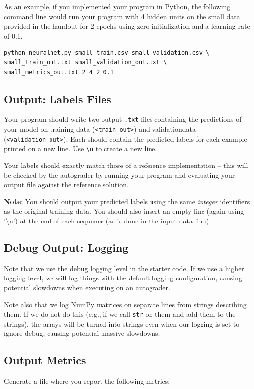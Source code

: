 \documentclass[11pt,addpoints,answers]{exam}
\begin{document}
As an example, if you implemented your program in Python, the following command line would run your program with 4 hidden units on the small data provided in the handout for 2 epochs using zero initialization and a learning rate of 0.1.
\\
\begin{lstlisting}[language=Shell]
python neuralnet.py small_train.csv small_validation.csv \
small_train_out.txt small_validation_out.txt \
small_metrics_out.txt 2 4 2 0.1 
\end{lstlisting}

\subsection{Output: Labels Files} \label{output}
Your program should write two output \texttt{.txt} files containing the predictions of your model on training data (\texttt{<train\_out>}) and validation\thinspace data (\texttt{<validation\_out>}). Each should contain the predicted labels for each example printed on a new line. Use \lstinline{\n} to create a new line. 

Your labels should exactly match those of a reference implementation -- this will be checked by the autograder by running your program and evaluating your output file against the reference solution.

\textbf{Note}: You should output your predicted labels using the same \emph{integer} identifiers as the original training data. You should also insert an empty line (again using ’\textbackslash n’) at the end of each sequence (as is done in the input data files).

\subsection{Debug Output: Logging}
Note that we use the debug logging level in the starter code.
If we use a higher logging level, we will log things with the default logging configuration, causing potential slowdowns when executing on an autograder.

Note also that we log NumPy matrices on separate lines from strings describing them. If we do not do this (e.g., if we call \verb|str| on them and add them to the strings), the arrays will be turned into strings even when our logging is set to ignore debug, causing potential massive slowdowns.

\subsection{Output Metrics} \label{metrics}
Generate a file where you report the following metrics: 
\end{document}
